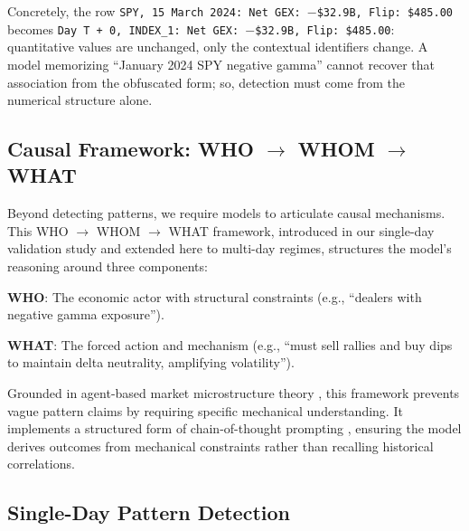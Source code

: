 \documentclass[jrfm,article,accept,moreauthors,pdftex]{Definitions/mdpi}
\begin{document}
Concretely, the row \texttt{{SPY,} %
{15 March 2024}: Net GEX: $-$\$32.9B, Flip: \$485.00} becomes \texttt{Day T + 0, INDEX\_1: Net GEX: $-$\$32.9B, Flip: \$485.00}: quantitative values are unchanged, only the contextual identifiers change. A model memorizing ``January 2024 SPY negative gamma'' cannot recover that association from the obfuscated form; so, detection must come from the numerical structure alone.

\subsection{Causal Framework: \texorpdfstring{WHO $\rightarrow$ WHOM $\rightarrow$ WHAT}{WHO->WHOM->WHAT}}
\label{subsec:causal}

Beyond detecting patterns, we require models to articulate causal mechanisms. This WHO $\rightarrow$ WHOM $\rightarrow$ WHAT framework, introduced in our single-day validation study \mbox{\citep{regan2025obfuscation}} and extended here to multi-day regimes, structures the model's reasoning around three components:

\textbf{WHO}: The economic actor with structural constraints (e.g., ``dealers with negative gamma exposure'').


\textbf{WHAT}: The forced action and mechanism (e.g., ``must sell rallies and buy dips to maintain delta neutrality, amplifying volatility'').

Grounded in agent-based market microstructure theory \citep{grossman1988liquidity,garleanu2009demand}, this framework prevents vague pattern claims by requiring specific mechanical understanding. It implements a structured form of chain-of-thought prompting \citep{wei2022chain}, ensuring the model derives outcomes from mechanical constraints rather than recalling historical correlations.


\subsection{Single-Day Pattern Detection}
\label{subsec:single_day_method}

\end{document}
